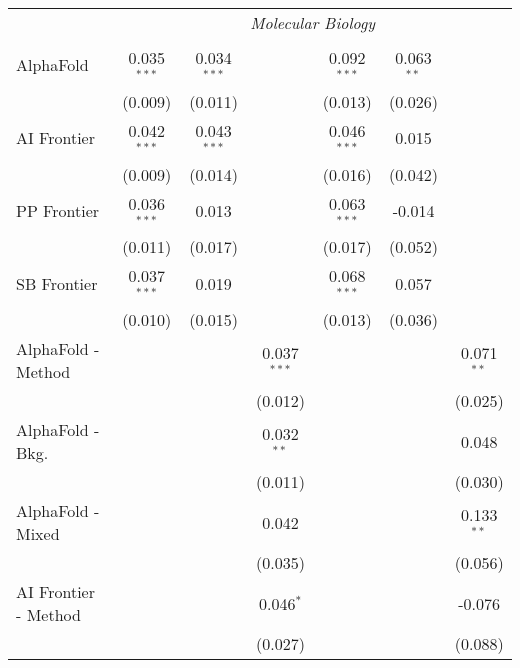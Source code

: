 \begin{tabular}{lcccccc}
 & \multicolumn{6}{c}{\textit{Molecular Biology}} \\ \\
   AlphaFold            & 0.035$^{***}$ & 0.034$^{***}$ &               & 0.092$^{***}$ & 0.063$^{**}$ &   \\   
                        & (0.009)       & (0.011)       &               & (0.013)       & (0.026)      &   \\   
   AI Frontier          & 0.042$^{***}$ & 0.043$^{***}$ &               & 0.046$^{***}$ & 0.015        &   \\   
                        & (0.009)       & (0.014)       &               & (0.016)       & (0.042)      &   \\   
   PP Frontier          & 0.036$^{***}$ & 0.013         &               & 0.063$^{***}$ & -0.014       &   \\   
                        & (0.011)       & (0.017)       &               & (0.017)       & (0.052)      &   \\   
   SB Frontier          & 0.037$^{***}$ & 0.019         &               & 0.068$^{***}$ & 0.057        &   \\   
                        & (0.010)       & (0.015)       &               & (0.013)       & (0.036)      &   \\   
   AlphaFold - Method   &               &               & 0.037$^{***}$ &               &              & 0.071$^{**}$\\   
                        &               &               & (0.012)       &               &              & (0.025)\\   
   AlphaFold - Bkg.     &               &               & 0.032$^{**}$  &               &              & 0.048\\   
                        &               &               & (0.011)       &               &              & (0.030)\\   
   AlphaFold - Mixed    &               &               & 0.042         &               &              & 0.133$^{**}$\\   
                        &               &               & (0.035)       &               &              & (0.056)\\   
   AI Frontier - Method &               &               & 0.046$^{*}$   &               &              & -0.076\\   
                        &               &               & (0.027)       &               &              & (0.088)\\   

\end{tabular}
